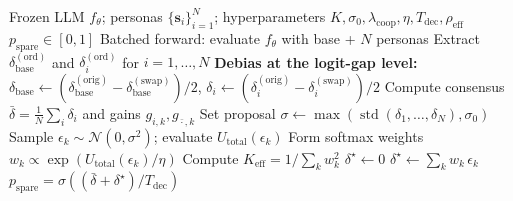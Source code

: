 \documentclass{article}
\begin{document}
\begin{algorithm}[t]
\caption{SWA-PTIS Inference for Scenario $\mathbf{x}$ in Country $c$}
\label{alg:swa}
\begin{algorithmic}[1]
\Require Frozen LLM $f_\theta$; personas $\{\mathbf{s}_i\}_{i=1}^{N}$;
         hyperparameters $K,\sigma_0,\lambda_{\text{coop}},\eta,T_{\text{dec}},\rho_{\text{eff}}$
\Ensure $p_{\text{spare}} \in [0,1]$
  \State Batched forward: evaluate $f_\theta$ with base + $N$ personas \hfill{}
  \State Extract $\delta_{\text{base}}^{(\text{ord})}$ and $\delta_i^{(\text{ord})}$ for $i=1,\ldots,N$
\EndFor
\State \textbf{Debias at the logit-gap level:}
       $\delta_{\text{base}} \leftarrow (\delta_{\text{base}}^{(\text{orig})}-\delta_{\text{base}}^{(\text{swap})})/2$,\;
       $\delta_i \leftarrow (\delta_i^{(\text{orig})}-\delta_i^{(\text{swap})})/2$  \hfill{}
\State Compute consensus $\bar{\delta}=\tfrac{1}{N}\sum_i\delta_i$ and gains
       $g_{i,k}, g_{\bar{\cdot},k}$ \hfill{}
\State Set proposal $\sigma \leftarrow \max(\operatorname{std}(\delta_1,\ldots,\delta_N),\sigma_0)$ \hfill{}
  \State Sample $\epsilon_k \sim \mathcal{N}(0,\sigma^2)$; evaluate $U_{\text{total}}(\epsilon_k)$ \hfill{}
\EndFor
\State Form softmax weights $w_k \propto \exp(U_{\text{total}}(\epsilon_k)/\eta)$ \hfill{}
\State Compute $K_{\text{eff}} = 1/\sum_k w_k^2$
 \hfill{}
  \State $\delta^{\star} \leftarrow 0$
\Else
  \State $\delta^{\star} \leftarrow \sum_k w_k\,\epsilon_k$
\EndIf
\State \Return $p_{\text{spare}} = \sigma((\bar{\delta} + \delta^{\star}) / T_{\text{dec}})$
\end{algorithmic}
\end{algorithm}
\end{document}
